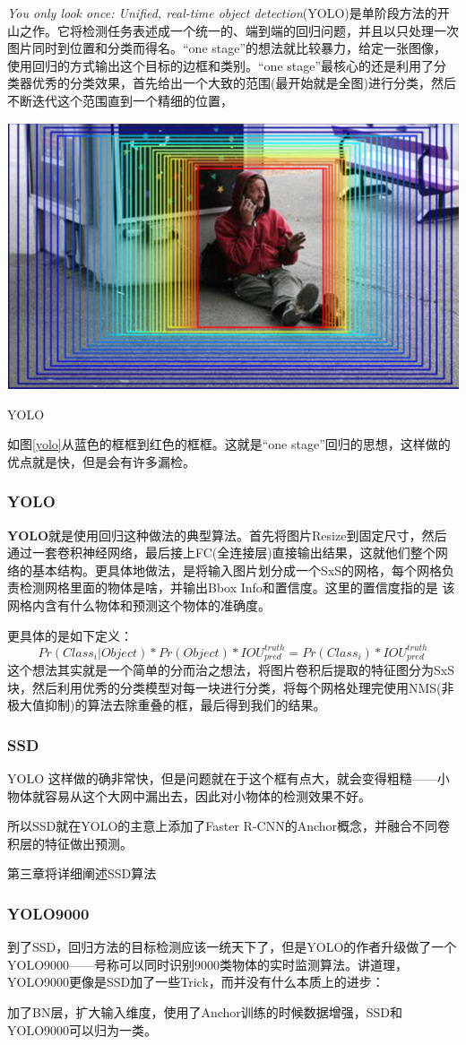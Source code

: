 \textit{You only look once: Unified, real-time object detection}(YOLO)\cite{yolo}是单阶段方法的开山之作。它将检测任务表述成一个统一的、端到端的回归问题，并且以只处理一次图片同时到位置和分类而得名。“one stage”的想法就比较暴力，给定一张图像，使用回归的方式输出这个目标的边框和类别。“one stage”最核心的还是利用了分类器优秀的分类效果，首先给出一个大致的范围(最开始就是全图)进行分类，然后不断迭代这个范围直到一个精细的位置，
\begin{uscfigure}
	\includegraphics[width=\textwidth]{./Pictures/od_regressor.png}	
	\caption{YOLO}
	\label{yolo}
\end{uscfigure}
如图\ref{yolo}从蓝色的框框到红色的框框。这就是“one stage”回归的思想，这样做的优点就是快，但是会有许多漏检。

\subsubsection{YOLO}
\textbf{YOLO}就是使用回归这种做法的典型算法。首先将图片Resize到固定尺寸，然后通过一套卷积神经网络，最后接上FC(全连接层)直接输出结果，这就他们整个网络的基本结构。更具体地做法，是将输入图片划分成一个SxS的网格，每个网格负责检测网格里面的物体是啥，并输出Bbox Info和置信度。这里的置信度指的是 该网格内含有什么物体和预测这个物体的准确度。

更具体的是如下定义：
\[
	Pr(Class_i | Object) * Pr(Object) * IOU_{pred}^{truth} = Pr(Class_i) * IOU_{pred}^{truth}
\]
这个想法其实就是一个简单的分而治之想法，将图片卷积后提取的特征图分为SxS块，然后利用优秀的分类模型对每一块进行分类，将每个网格处理完使用NMS(非极大值抑制)的算法去除重叠的框，最后得到我们的结果。
\subsubsection{SSD}
YOLO 这样做的确非常快，但是问题就在于这个框有点大，就会变得粗糙——小物体就容易从这个大网中漏出去，因此对小物体的检测效果不好。

所以SSD就在YOLO的主意上添加了Faster R-CNN的Anchor概念，并融合不同卷积层的特征做出预测。

第三章将详细阐述SSD算法

\subsubsection{YOLO9000}
到了SSD，回归方法的目标检测应该一统天下了，但是YOLO的作者升级做了一个 YOLO9000——号称可以同时识别9000类物体的实时监测算法。讲道理，YOLO9000更像是SSD加了一些Trick，而并没有什么本质上的进步：

加了BN层，扩大输入维度，使用了Anchor训练的时候数据增强，SSD和YOLO9000可以归为一类。

